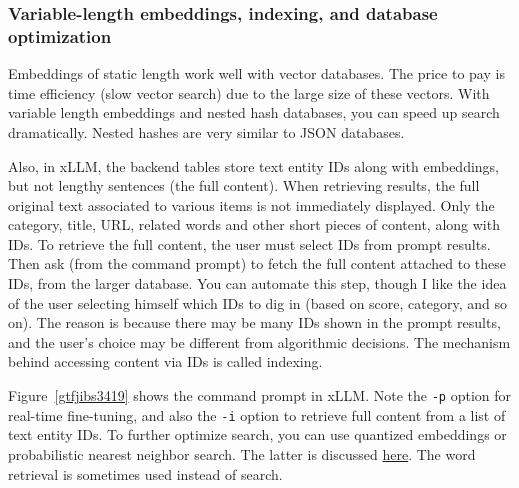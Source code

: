 \documentclass[10pt]{article}
\begin{document}
{\subsubsection{Variable-length embeddings, indexing, and database optimization}
Embeddings of static length work well with \textcolor{index}{vector databases}. The price to pay is time efficiency (slow \textcolor{index}{vector search}) due to the large size of these vectors. With 
\textcolor{index}{variable length embeddings} and 
\textcolor{index}{nested hash databases}, you can speed up search dramatically. Nested hashes are very similar to 
\textcolor{index}{JSON databases}.

Also, in xLLM, the backend tables store \textcolor{index}{text entity} IDs along with embeddings, but not lengthy sentences (the full content). When retrieving results, the full original text associated to various items is not immediately displayed. Only the category, title, URL, related words and other short pieces of content, along with IDs. To retrieve the full content, the user must select IDs from prompt results. Then ask (from the command prompt) to fetch the full content attached to these IDs, from the larger database. You can automate this step, though I like the idea of the user selecting himself which IDs to dig in (based on score, category, and so on). The reason is because there may be many IDs shown in the prompt results, and the user’s choice may be different from algorithmic decisions. The mechanism behind accessing content via IDs is called \textcolor{index}{indexing}.

Figure~\ref{gtfjibs3419} shows the \textcolor{index}{command prompt} in xLLM. Note 
the \texttt{-p} option for real-time fine-tuning, and also the \texttt{-i} option to retrieve full content from a list of text entity IDs.
To further optimize search, you can use \textcolor{index}{quantized embeddings} or \textcolor{index}{probabilistic nearest neighbor search}. The latter is discussed \href{https://mltblog.com/48hQWfY}{here}. The word \textcolor{index}{retrieval} is sometimes used instead of search.

}
\end{document}

